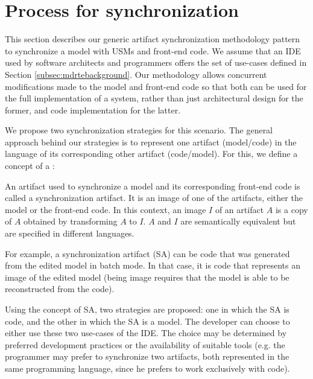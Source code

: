 \section{Process for synchronization}
\label{sec:collaboration}
This section describes our generic artifact synchronization methodology pattern to synchronize a model with USMs and front-end code.
We assume that an IDE used by software architects and programmers offers the set of use-cases defined in Section \ref{subsec:mdrtebackground}. 
Our methodology allows concurrent modifications made to the model
and front-end code so that both can be used for the full implementation of a system,
rather than just architectural design for the former,
and code implementation for the latter.


We propose two synchronization strategies for this scenario.
The general approach behind our strategies
is to represent one artifact (model/code) in the language of its corresponding other artifact (code/model).
For this, we define a
concept of a :

\begin{definition}
	An artifact used to synchronize a model and its corresponding front-end code
	is called a synchronization artifact.
	It is an image of one of the artifacts, either the model or the front-end code.
	In this context, an image $I$ of an artifact $A$ is a copy of $A$ obtained by
	transforming $A$ to $I$. $A$ and $I$ are semantically equivalent but are specified in different languages.
\end{definition}

For example, a synchronization artifact (SA) can be code that was generated from the edited model in batch mode.
In that case, it is code that represents an image of the edited model (being image requires that the model is able to be reconstructed from the code).

Using the concept of SA, two strategies are
proposed: one in which the SA is code,
and the other in which the SA is a model.
The developer can choose to either use these two use-cases of the IDE. The choice may be determined by
preferred development practices or the availability of suitable tools (e.g. the programmer
may prefer to synchronize two artifacts, both represented
in the same programming language, since he prefers to
work exclusively with code).

